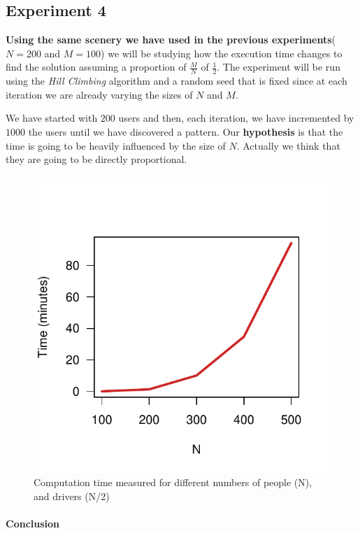 \documentclass[12]{article}
\begin{document}
\subsection{Experiment 4}
\textbf{Using the same scenery we have used in the previous experiments}($N=200$ and $M=100$) we will be studying how the execution time changes to find the solution  assuming a proportion of $\frac{M}{N}$ of $\frac{1}{2}$. The experiment will be run using the     
 \textit{Hill Climbing} algorithm and a random seed that is fixed since at each iteration we are already varying the sizes of $N$ and $M$.

We have started with $200$ users and then, each iteration, we have incremented by $1000$ the users until we have discovered a pattern. Our \textbf{hypothesis} is that the time is going to be heavily influenced by the size of $N$. Actually we think that they are going to be directly proportional. 

\begin{figure}[H]
\centering
\includegraphics[scale=0.8]{Results/data_4_1.pdf}
\caption{Computation time measured for different numbers of people (N), and drivers (N/2)}
\label{timedifferentN}
\end{figure}


\paragraph{Conclusion}\mbox{}\\
\end{document}
